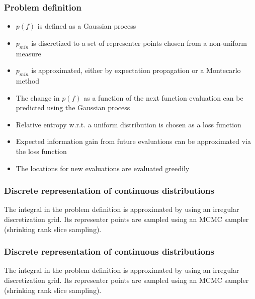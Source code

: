 \documentclass[10pt,handout]{beamer}
\begin{document}
 
\begin{frame}
\frametitle{Problem definition}

\begin{itemize}
	\item $p(f)$ is defined as a Gaussian process
	\item $p_{min}$ is discretized to a set of representer points chosen from
	a non-uniform measure
	\item $p_{min}$ is approximated, either by expectation propagation
	or a Montecarlo method
	\item The change in $p(f)$ as a function of the next function evaluation
	can be predicted using the Gaussian process
	\item Relative entropy w.r.t. a uniform distribution is chosen as a loss
	function
	\item Expected information gain from future evaluations can be 
	approximated via the loss function
	\item The locations for new evaluations are evaluated greedily
\end{itemize}

\end{frame}

\begin{frame}
\frametitle{Discrete representation of continuous distributions}

The integral in the problem definition is approximated by using an irregular
discretization grid. Its representer points are sampled using an MCMC sampler
(shrinking rank slice sampling).

\end{frame}

\begin{frame}
\frametitle{Discrete representation of continuous distributions}

The integral in the problem definition is approximated by using an irregular
discretization grid. Its representer points are sampled using an MCMC sampler
(shrinking rank slice sampling).

\end{frame}


\end{document}
